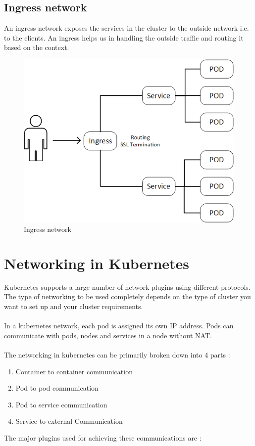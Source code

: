 \documentclass[12pt]{report}
\begin{document}
\subsection{Ingress network}
An ingress network exposes the services in the cluster to the outside network i.e. to the clients. An ingress helps us in handling the outside traffic and routing it based on the context.\\
\begin{figure}[h!]
	\begin{center}
		\includegraphics[totalheight=0.31\textheight]{ingress}
		\caption{Ingress network \cite{Ingress}}
	\end{center}
\end{figure}
\section{Networking in Kubernetes}
Kubernetes supports a large number of network plugins using different protocols. The type of networking to be used completely depends on the type of cluster you want to set up and your cluster requirements.\\\\
In a kubernetes network, each pod is assigned its own IP address. Pods can communicate with pods, nodes and services in a node without NAT. \\\\
The networking in kubernetes can be primarily broken down into 4 parts :
\begin{enumerate}
	\item Container to container communication
	\item Pod to pod communication
	\item Pod to service communication
	\item Service to external Communication
\end{enumerate}
The major plugins used for achieving these communications are :
\end{document}
